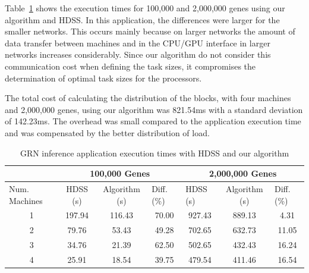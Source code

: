 \documentclass[journal]{IEEEtran}
\begin{document}

Table~\ref{table: gene} shows the execution times for 100,000 and 2,000,000
genes using our algorithm and HDSS. In this application, the differences were
larger for the smaller networks. This occurs mainly because on larger networks
the amount of data transfer between machines and in the CPU/GPU interface in
larger networks increases considerably. Since our algorithm do not consider this
communication cost when defining the task sizes, it compromises the
determination of optimal task sizes for the processors.

The total cost of calculating the distribution of the blocks, with four machines
and 2,000,000 genes, using our algorithm was 821.54ms with a standard deviation
of 142.23ms. The overhead was small compared to the application execution time
and was compensated by the better distribution of load.


\begin{table}[htb]
\centering
\caption{GRN inference application execution times with HDSS and our algorithm}
\begin{scriptsize}
\begin{tabular}{c|c|c|c|c|c|c|}
\cline{2-7}
\multicolumn{1}{l|}{}                 & \multicolumn{3}{c|}{100,000 Genes}                              & \multicolumn{3}{c|}{2,000,000 Genes}                                                  \\ \hline
\multicolumn{1}{|l|}{Num. Machines} & HDSS (s) & Algorithm (s) & \multicolumn{1}{l|}{Diff. (\%)} & \multicolumn{1}{l|}{HDSS (s)} & Algorithm (s) & \multicolumn{1}{l|}{Diff. (\%)} \\ \hline
\multicolumn{1}{|c|}{1 }       &197.94     & 116.43              & 70.00                         & 927.43                         & 889.13              &           4.31                 \\ \hline
\multicolumn{1}{|c|}{2 }      & 79.76     & 53.43              & 49.28                            & 702.65                          & 632.73              & 11.05                           \\ \hline
\multicolumn{1}{|c|}{3 }      & 34.76     & 21.39              & 62.50                            & 502.65                          & 432.43             &               16.24                  \\ \hline
\multicolumn{1}{|c|}{4 }      & 25.91     & 18.54              & 39.75                            & 479.54                          & 411.46             &               16.54  \\ \hline
\end{tabular}
\end{scriptsize}
\label{table: gene}
\end{table}
\end{document}
